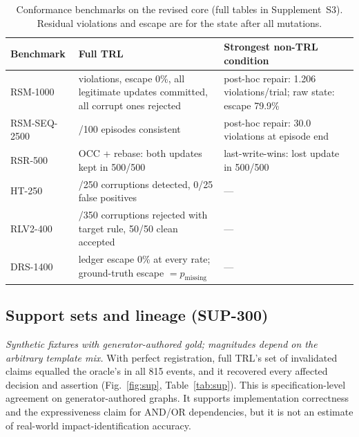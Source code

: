 \documentclass[cmc,article,submit,moreauthors,pdftex]{Definitions/tsp}
\newcommand{\suppl}[1]{Supplement~#1}
\begin{document}
\begin{table}[t]
\centering
\caption{Conformance benchmarks on the revised core (full tables in \suppl{S3}). Residual violations and escape are for the state after all mutations.}
\label{tab:conf}
\scriptsize
\begin{tabularx}{\columnwidth}{l>{\raggedright\arraybackslash}X>{\raggedright\arraybackslash}X}
\toprule
Benchmark & Full TRL & Strongest non-TRL condition \\
\midrule
RSM-1000 & 0 violations, escape 0\%, all legitimate updates committed, all corrupt ones rejected & post-hoc repair: 1.206 violations/trial; raw state: escape 79.9\% \\
RSM-SEQ-2500 & 100/100 episodes consistent & post-hoc repair: 30.0 violations at episode end \\
RSR-500 & OCC + rebase: both updates kept in 500/500 & last-write-wins: lost update in 500/500 \\
HT-250 & 250/250 corruptions detected, 0/25 false positives & --- \\
RLV2-400 & 350/350 corruptions rejected with target rule, 50/50 clean accepted & --- \\
DRS-1400 & ledger escape 0\% at every rate; ground-truth escape $=p_{\text{missing}}$ & --- \\
\bottomrule
\end{tabularx}
\end{table}

\subsection{Support sets and lineage (SUP-300)}
\label{sec:sup_results}
\emph{Synthetic fixtures with generator-authored gold; magnitudes depend on the arbitrary template mix.} With perfect registration, full TRL's set of invalidated claims equalled the oracle's in all 815 events, and it recovered every affected decision and assertion (Fig.~\ref{fig:sup}, Table~\ref{tab:sup}). This is specification-level agreement on generator-authored graphs. It supports implementation correctness and the expressiveness claim for AND/OR dependencies, but it is not an estimate of real-world impact-identification accuracy.
\end{document}
